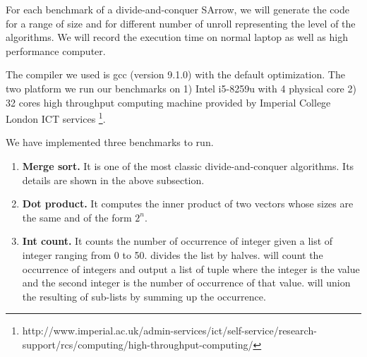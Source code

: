 For each benchmark of a divide-and-conquer SArrow, we will generate the code for a range of size and for different number of unroll representing the level of the algorithms. We will record the execution time on normal laptop as well as high performance computer.

The compiler we used is gcc (version 9.1.0) with the default optimization. The two platform we run our benchmarks on 1) Intel i5-8259u with 4 physical core 2) 32 cores high throughput computing machine provided by Imperial College London ICT services \footnote{http://www.imperial.ac.uk/admin-services/ict/self-service/research-support/rcs/computing/high-throughput-computing/}.

We have implemented three benchmarks to run.
\begin{enumerate}
    \item \textbf{Merge sort. } It is one of the most classic divide-and-conquer algorithms. Its details are shown in the above subsection.
    \item \textbf{Dot product. } It computes the inner product of two vectors whose sizes are the same and of the form $2^n$.
    \item \textbf{Int count. } It counts the number of occurrence of integer given a list of integer ranging from 0 to 50.  divides the list by halves.  will count the occurrence of integers and output a list of tuple where the integer is the value and the second integer is the number of occurrence of that value.  will union the resulting of sub-lists by summing up the occurrence.
\end{enumerate}
